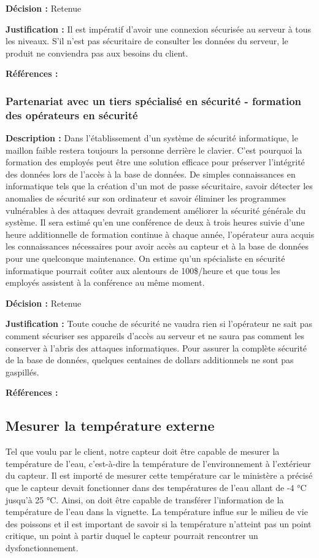 \textbf{Décision :}  Retenue

\textbf{Justification :}  Il est impératif d’avoir une connexion sécurisée au serveur à tous les niveaux. S’il n’est pas sécuritaire de consulter les données du serveur, le produit ne conviendra pas aux besoins du client.

\textbf{Références :} 

\subsubsection{Partenariat avec un tiers spécialisé en sécurité - formation des opérateurs en sécurité}

\textbf{Description :} Dans l’établissement d’un système de sécurité informatique, le maillon faible restera toujours la personne derrière le clavier. C’est pourquoi la formation des employés peut être une solution efficace pour préserver l’intégrité des données lors de l’accès à la base de données. De simples connaissances en informatique tels que la création d’un mot de passe sécuritaire, savoir détecter les anomalies de sécurité sur son ordinateur et savoir éliminer les programmes vulnérables à des attaques devrait grandement améliorer la sécurité générale du système. Il sera estimé qu’en une conférence de deux à trois heures suivie d’une heure additionnelle de formation continue à chaque année, l’opérateur aura acquis les connaissances nécessaires pour avoir accès au capteur et à la base de données pour une quelconque maintenance. On estime qu’un spécialiste en sécurité informatique pourrait coûter aux alentours de 100\$/heure et que tous les employés assistent à la conférence au même moment. 

\textbf{Décision :}  Retenue

\textbf{Justification :}  Toute couche de sécurité ne vaudra rien si l’opérateur ne sait pas comment sécuriser ses appareils d’accès au serveur et ne saura pas comment les conserver à l’abris des attaques informatiques. Pour assurer la complète sécurité de la base de données, quelques centaines de dollars additionnels ne sont pas gaspillés.

\textbf{Références :} 


\subsection{Mesurer la température externe} 
Tel que voulu par le client, notre capteur doit être capable de mesurer la température de l’eau, c’est-à-dire la température de l’environnement à l’extérieur du capteur. Il est importé de mesurer cette température car le ministère a précisé que le capteur devait fonctionner dans des températures de l’eau allant de -4 °C jusqu’à 25 °C. Ainsi, on doit être capable de transférer l’information de la température de l’eau dans la vignette. La température influe sur le milieu de vie des poissons et il est important de savoir si la température n’atteint pas un point critique, un point à partir duquel le capteur pourrait rencontrer un dysfonctionnement. 

